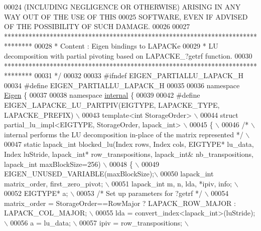 \begin{DoxyCode}
00024 \textcolor{comment}{ (INCLUDING NEGLIGENCE OR OTHERWISE) ARISING IN ANY WAY OUT OF THE USE OF THIS}
00025 \textcolor{comment}{ SOFTWARE, EVEN IF ADVISED OF THE POSSIBILITY OF SUCH DAMAGE.}
00026 \textcolor{comment}{}
00027 \textcolor{comment}{ ********************************************************************************}
00028 \textcolor{comment}{ *   Content : Eigen bindings to LAPACKe}
00029 \textcolor{comment}{ *     LU decomposition with partial pivoting based on LAPACKE\_?getrf function.}
00030 \textcolor{comment}{ ********************************************************************************}
00031 \textcolor{comment}{*/}
00032 
00033 \textcolor{preprocessor}{#ifndef EIGEN\_PARTIALLU\_LAPACK\_H}
00034 \textcolor{preprocessor}{#define EIGEN\_PARTIALLU\_LAPACK\_H}
00035 
00036 \textcolor{keyword}{namespace }\hyperlink{namespace_eigen}{Eigen} \{ 
00037 
00038 \textcolor{keyword}{namespace }\hyperlink{namespaceinternal}{internal} \{
00039 
00042 \textcolor{preprocessor}{#define EIGEN\_LAPACKE\_LU\_PARTPIV(EIGTYPE, LAPACKE\_TYPE, LAPACKE\_PREFIX) \(\backslash\)}
00043 \textcolor{preprocessor}{template<int StorageOrder> \(\backslash\)}
00044 \textcolor{preprocessor}{struct partial\_lu\_impl<EIGTYPE, StorageOrder, lapack\_int> \(\backslash\)}
00045 \textcolor{preprocessor}{\{ \(\backslash\)}
00046 \textcolor{preprocessor}{  }\textcolor{comment}{/* \(\backslash\)internal performs the LU decomposition in-place of the matrix represented */}\textcolor{preprocessor}{ \(\backslash\)}
00047 \textcolor{preprocessor}{  static lapack\_int blocked\_lu(Index rows, Index cols, EIGTYPE* lu\_data, Index luStride, lapack\_int*
       row\_transpositions, lapack\_int& nb\_transpositions, lapack\_int maxBlockSize=256) \(\backslash\)}
00048 \textcolor{preprocessor}{  \{ \(\backslash\)}
00049 \textcolor{preprocessor}{    EIGEN\_UNUSED\_VARIABLE(maxBlockSize);\(\backslash\)}
00050 \textcolor{preprocessor}{    lapack\_int matrix\_order, first\_zero\_pivot; \(\backslash\)}
00051 \textcolor{preprocessor}{    lapack\_int m, n, lda, *ipiv, info; \(\backslash\)}
00052 \textcolor{preprocessor}{    EIGTYPE* a; \(\backslash\)}
00053 \textcolor{preprocessor}{}\textcolor{comment}{/* Set up parameters for ?getrf */}\textcolor{preprocessor}{ \(\backslash\)}
00054 \textcolor{preprocessor}{    matrix\_order = StorageOrder==RowMajor ? LAPACK\_ROW\_MAJOR : LAPACK\_COL\_MAJOR; \(\backslash\)}
00055 \textcolor{preprocessor}{    lda = convert\_index<lapack\_int>(luStride); \(\backslash\)}
00056 \textcolor{preprocessor}{    a = lu\_data; \(\backslash\)}
00057 \textcolor{preprocessor}{    ipiv = row\_transpositions; \(\backslash\)}

\end{DoxyCode}
